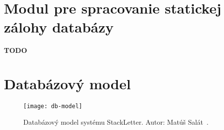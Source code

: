 \section{Modul pre spracovanie statickej zálohy databázy}

\textbf{TODO}

\section{Databázový model}
\begin{figure}[H]\begin{center}
\texttt{[image: db-model]}
\caption{Databázový model systému StackLetter. Autor: Matúš Salát~\cite{Salat2018}. \label{fig:db-model}}\end{center}
\end{figure}

